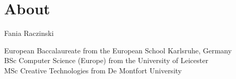 
\pagestyle{empty}

\chapter{About}
\label{about}

Fania Raczinski

European Baccalaureate from the European School Karlsruhe, Germany\\
BSc Computer Science (Europe) from the University of Leicester\\
MSc Creative Technologies from De Montfort University

\clearpage
